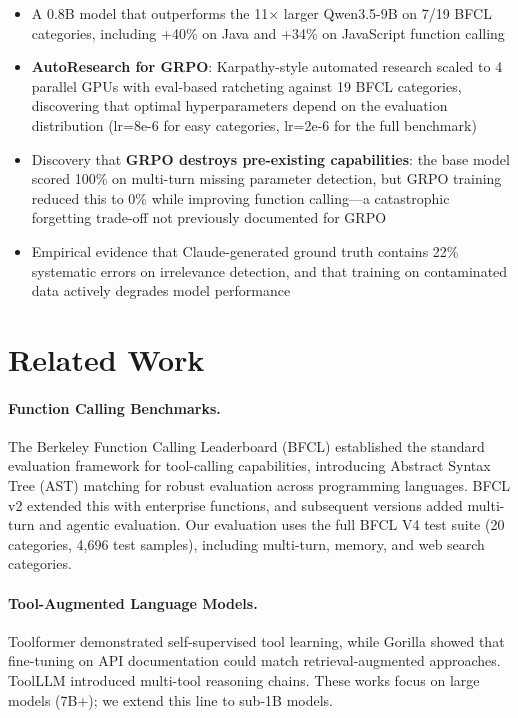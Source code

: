 \documentclass[10pt,twocolumn]{article}
\begin{document}
\begin{itemize}[itemsep=1pt, topsep=3pt]
    \item A 0.8B model that outperforms the 11$\times$ larger Qwen3.5-9B on 7/19 BFCL categories, including +40\% on Java and +34\% on JavaScript function calling
    \item \textbf{AutoResearch for GRPO}: Karpathy-style automated research scaled to 4 parallel GPUs with eval-based ratcheting against 19 BFCL categories, discovering that optimal hyperparameters depend on the evaluation distribution (lr=8e-6 for easy categories, lr=2e-6 for the full benchmark)
    \item Discovery that \textbf{GRPO destroys pre-existing capabilities}: the base model scored 100\% on multi-turn missing parameter detection, but GRPO training reduced this to 0\% while improving function calling---a catastrophic forgetting trade-off not previously documented for GRPO
    \item Empirical evidence that Claude-generated ground truth contains 22\% systematic errors on irrelevance detection, and that training on contaminated data actively degrades model performance
\end{itemize}

\section{Related Work}

\paragraph{Function Calling Benchmarks.}
The Berkeley Function Calling Leaderboard (BFCL) \citep{patil2024bfcl} established the standard evaluation framework for tool-calling capabilities, introducing Abstract Syntax Tree (AST) matching for robust evaluation across programming languages. BFCL v2 extended this with enterprise functions, and subsequent versions added multi-turn and agentic evaluation. Our evaluation uses the full BFCL V4 test suite (20 categories, 4,696 test samples), including multi-turn, memory, and web search categories.

\paragraph{Tool-Augmented Language Models.}
Toolformer \citep{schick2023toolformer} demonstrated self-supervised tool learning, while Gorilla \citep{patil2023gorilla} showed that fine-tuning on API documentation could match retrieval-augmented approaches. ToolLLM \citep{qin2024toolllm} introduced multi-tool reasoning chains. These works focus on large models (7B+); we extend this line to sub-1B models.
\end{document}
